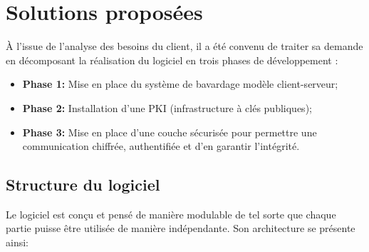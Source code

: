 \documentclass[a4paper,11pt,french]{book}
\begin{document}
\section{Solutions proposées}
\`A l'issue de l'analyse des besoins du client, il a été convenu de traiter sa demande en décomposant la réalisation du logiciel en trois phases de développement :
\begin{itemize}
\item \textbf{Phase 1:} Mise en place du système de bavardage modèle client-serveur;
\item \textbf{Phase 2:} Installation d'une PKI (infrastructure à clés publiques);
\item \textbf{Phase 3:} Mise en place d'une couche sécurisée pour permettre une communication chiffrée, authentifiée et d'en garantir l'intégrité.
\end{itemize}
\vspace{.5cm}

\subsection{Structure du logiciel}
Le logiciel est conçu et pensé de manière modulable de tel sorte que chaque partie puisse \^etre utilisée de manière indépendante. Son architecture se présente ainsi:\\
\end{document}
